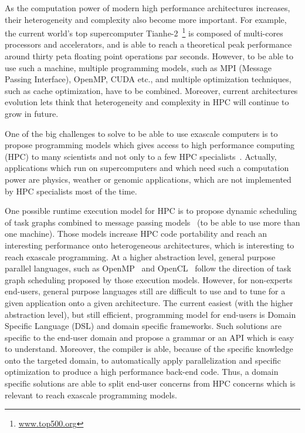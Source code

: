
As the computation power of modern high performance architectures increases, their heterogeneity and complexity also become more important. For example, the current world's top supercomputer Tianhe-2~\footnote{\url{www.top500.org}} is composed of multi-cores processors and accelerators, and is able to reach a theoretical peak performance around thirty peta floating point operations par seconds. However, to be able to use such a machine, multiple programming models, such as MPI (Message Passing Interface), OpenMP, CUDA etc., and multiple optimization techniques, such as cache optimization, have to be combined. Moreover, current architectures evolution lets think that heterogeneity and complexity in HPC will continue to grow in future.

One of the big challenges to solve to be able to use exascale computers is to propose programming models which gives access to high performance computing (HPC) to many scientists and not only to a few HPC specialists~\cite{ETP4HPC2013}. Actually, applications which run on supercomputers and which need such a computation power are physics, weather or genomic applications, which are not implemented by HPC specialists most of the time.

One possible runtime execution model for HPC is to propose dynamic scheduling of task graphs combined to message passing models~\cite{Gautier:2013:XRS:2510661.2511383,Augonnet2011,wu:hal-01078359} (to be able to use more than one machine). Those models increase HPC code portability and reach an interesting performance onto heterogeneous architectures, which is interesting to reach exascale programming. At a higher abstraction level, general purpose parallel languages, such as OpenMP~\cite{660313} and OpenCL~\cite{Stone:2010:OPP:622179.1803953} follow the direction of task graph scheduling proposed by those execution models. However, for non-experts end-users, general purpose languages still are difficult to use and to tune for a given application onto a given architecture. The current easiest (with the higher abstraction level), but still efficient, programming model for end-users is Domain Specific Language (DSL) and domain specific frameworks. Such solutions are specific to the end-user domain and propose a grammar or an API which is easy to understand. Moreover, the compiler is able, because of the specific knowledge onto the targeted domain, to automatically apply parallelization and specific optimization to produce a high performance back-end code. Thus, a domain specific solutions are able to split end-user concerns from HPC concerns which is relevant to reach exascale programming models.

